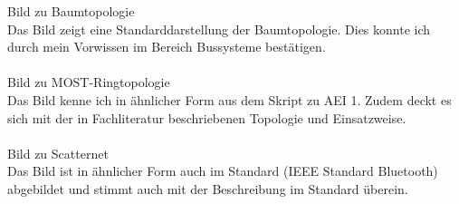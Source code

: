 Bild zu Baumtopologie \cite{.MH_Tree}\\
Das Bild zeigt eine Standarddarstellung der Baumtopologie. Dies konnte ich 
durch mein Vorwissen im Bereich Bussysteme bestätigen.\\\\

Bild zu MOST-Ringtopologie \cite{.MH_Ring}\\
Das Bild kenne ich in ähnlicher Form aus dem Skript zu AEI 1. Zudem deckt
es sich mit der in Fachliteratur beschriebenen Topologie und Einsatzweise.\\\\

Bild zu Scatternet \cite{.MH_Scatter}\\
Das Bild ist in ähnlicher Form auch im Standard (IEEE Standard Bluetooth) 
abgebildet und stimmt auch mit der Beschreibung im Standard überein.\\\\
